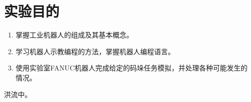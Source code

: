 \documentclass{ctexart}
\begin{document}



\newpage
\tableofcontents


\newpage
\pagestyle{fancy}
\fancyhf{}
\fancyfoot[C]{\thepage}
\section{实验目的}
\begin{enumerate}
    \item 掌握工业机器人的组成及其基本概念。
    \item 学习机器人示教编程的方法，掌握机器人编程语言。
    \item 使用实验室FANUC机器人完成给定的码垛任务模拟，并处理各种可能发生的情况。
\end{enumerate}

洪流中。
\end{document}
